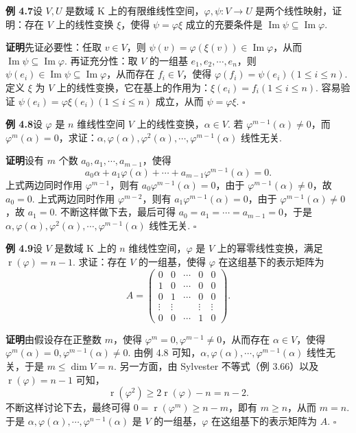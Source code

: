 \documentclass[UTF8,12pt,a4paper,fontset=fandol]{ctexart}
\begin{document}
\noindent\textbf{例 4.7}\quad 设 $V,U$ 是数域 $\mathrm{K}$ 上的有限维线性空间，$\varphi,\psi:V\to U$ 是两个线性映射，证明：存在 $V$ 上的线性变换 $\xi$，使得 $\psi=\varphi\xi$ 成立的充要条件是 $\operatorname{Im}\psi\subseteq\operatorname{Im}\varphi$.

\noindent\textbf{证明}\quad 先证必要性：任取 $v\in V$，则 $\psi(v)=\varphi(\xi(v))\in\operatorname{Im}\varphi$，从而 $\operatorname{Im}\psi\subseteq\operatorname{Im}\varphi$. 再证充分性：取 $V$ 的一组基 $e_1,e_2,\cdots,e_n$，则 $\psi(e_i)\in\operatorname{Im}\psi\subseteq\operatorname{Im}\varphi$，从而存在 $f_i\in V$，使得 $\varphi(f_i)=\psi(e_i)(1\le i\le n)$. 定义 $\xi$ 为 $V$ 上的线性变换，它在基上的作用为：$\xi(e_i)=f_i(1\le i\le n)$. 容易验证 $\psi(e_i)=\varphi\xi(e_i)(1\le i\le n)$ 成立，从而 $\psi=\varphi\xi$. $\square$

\noindent\textbf{例 4.8}\quad 设 $\varphi$ 是 $n$ 维线性空间 $V$ 上的线性变换，$\alpha\in V$. 若 $\varphi^{m-1}(\alpha)\ne0$，而 $\varphi^m(\alpha)=0$，求证：$\alpha,\varphi(\alpha),\varphi^2(\alpha),\cdots,\varphi^{m-1}(\alpha)$ 线性无关.

\noindent\textbf{证明}\quad 设有 $m$ 个数 $a_0,a_1,\cdots,a_{m-1}$，使得
\[
a_0\alpha+a_1\varphi(\alpha)+\cdots+a_{m-1}\varphi^{m-1}(\alpha)=0.
\]
上式两边同时作用 $\varphi^{m-1}$，则有 $a_0\varphi^{m-1}(\alpha)=0$，由于 $\varphi^{m-1}(\alpha)\ne0$，故 $a_0=0$. 上式两边同时作用 $\varphi^{m-2}$，则有 $a_1\varphi^{m-1}(\alpha)=0$，由于 $\varphi^{m-1}(\alpha)\ne0$，故 $a_1=0$. 不断这样做下去，最后可得 $a_0=a_1=\cdots=a_{m-1}=0$，于是 $\alpha,\varphi(\alpha),\varphi^2(\alpha),\cdots,\varphi^{m-1}(\alpha)$ 线性无关. $\square$

\noindent\textbf{例 4.9}\quad 设 $V$ 是数域 $\mathrm{K}$ 上的 $n$ 维线性空间，$\varphi$ 是 $V$ 上的幂零线性变换，满足 $\operatorname{r}(\varphi)=n-1$. 求证：存在 $V$ 的一组基，使得 $\varphi$ 在这组基下的表示矩阵为
\[
A=\left(\begin{array}{ccccc}
0 & 0 & \cdots & 0 & 0\\
1 & 0 & \cdots & 0 & 0\\
0 & 1 & \cdots & 0 & 0\\
\vdots & \vdots &        & \vdots & \vdots\\
0 & 0 & \cdots & 1 & 0
\end{array}\right).
\]

\noindent\textbf{证明}\quad 由假设存在正整数 $m$，使得 $\varphi^m=0,\varphi^{m-1}\ne0$，从而存在 $\alpha\in V$，使得 $\varphi^m(\alpha)=0,\varphi^{m-1}(\alpha)\ne0$. 由例 4.8 可知，$\alpha,\varphi(\alpha),\cdots,\varphi^{m-1}(\alpha)$ 线性无关，于是 $m\le\dim V=n$. 另一方面，由 Sylvester 不等式（例 3.66）以及 $\operatorname{r}(\varphi)=n-1$ 可知，
\[
\operatorname{r}(\varphi^2)\ge 2\operatorname{r}(\varphi)-n=n-2.
\]
不断这样讨论下去，最终可得 $0=\operatorname{r}(\varphi^m)\ge n-m$，即有 $m\ge n$，从而 $m=n$. 于是 $\alpha,\varphi(\alpha),\cdots,\varphi^{n-1}(\alpha)$ 是 $V$ 的一组基，$\varphi$ 在这组基下的表示矩阵为 $A$. $\square$
\end{document}
